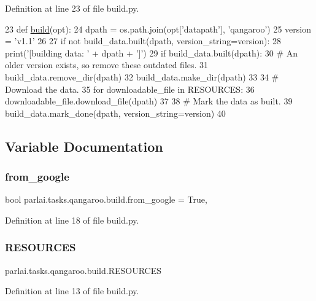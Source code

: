 Definition at line 23 of file build.\+py.


\begin{DoxyCode}
23 \textcolor{keyword}{def }\hyperlink{namespacedialog__babi__feedback_1_1build_a7a9d289f7493a5ded13c4b7f071b6184}{build}(opt):
24     dpath = os.path.join(opt[\textcolor{stringliteral}{'datapath'}], \textcolor{stringliteral}{'qangaroo'})
25     version = \textcolor{stringliteral}{'v1.1'}
26 
27     \textcolor{keywordflow}{if} \textcolor{keywordflow}{not} build\_data.built(dpath, version\_string=version):
28         print(\textcolor{stringliteral}{'[building data: '} + dpath + \textcolor{stringliteral}{']'})
29         \textcolor{keywordflow}{if} build\_data.built(dpath):
30             \textcolor{comment}{# An older version exists, so remove these outdated files.}
31             build\_data.remove\_dir(dpath)
32         build\_data.make\_dir(dpath)
33 
34         \textcolor{comment}{# Download the data.}
35         \textcolor{keywordflow}{for} downloadable\_file \textcolor{keywordflow}{in} RESOURCES:
36             downloadable\_file.download\_file(dpath)
37 
38         \textcolor{comment}{# Mark the data as built.}
39         build\_data.mark\_done(dpath, version\_string=version)
40 \end{DoxyCode}


\subsection{Variable Documentation}
\mbox{\label{namespaceparlai_1_1tasks_1_1qangaroo_1_1build_aefce1721bef5d264c1fa4a9218dc61c8}} 
\subsubsection{\texorpdfstring{from\+\_\+google}{from\_google}}
{\footnotesize\ttfamily bool parlai.\+tasks.\+qangaroo.\+build.\+from\+\_\+google = True,}



Definition at line 18 of file build.\+py.

\mbox{\label{namespaceparlai_1_1tasks_1_1qangaroo_1_1build_a9df9ad31290da5c6e60e353e6e69afa1}} 
\subsubsection{\texorpdfstring{R\+E\+S\+O\+U\+R\+C\+ES}{RESOURCES}}
{\footnotesize\ttfamily parlai.\+tasks.\+qangaroo.\+build.\+R\+E\+S\+O\+U\+R\+C\+ES}



Definition at line 13 of file build.\+py.

